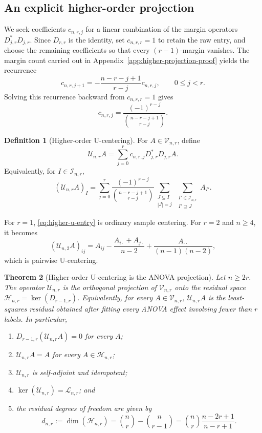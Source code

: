 \documentclass[11pt]{article}
\theoremstyle{plain}
\newtheorem{theorem}{Theorem}[section]
\theoremstyle{definition}
\newtheorem{definition}[theorem]{Definition}
\theoremstyle{remark}
\newcommand{\cI}{\mathcal I}
\newcommand{\cU}{\mathcal U}
\newcommand{\cH}{\mathcal H}
\newcommand{\cL}{\mathcal L}
\newcommand{\cV}{\mathcal V}
\begin{document}
\subsection{An explicit higher-order projection}
We seek coefficients $c_{n,r,j}$ for a linear combination of the margin
operators $D_{j,r}^\ast D_{j,r}$.  Since $D_{r,r}$ is the identity, set
$c_{n,r,r}=1$ to retain the raw entry, and choose the remaining coefficients
so that every $(r-1)$-margin vanishes.
The margin count carried out in
Appendix~\ref{app:higher-projection-proof} yields the recurrence
 \[
 c_{n,r,j+1}
 =-\frac{n-r-j+1}{r-j}c_{n,r,j},
 \qquad 0\le j<r.
\]
Solving this recurrence backward from $c_{n,r,r}=1$ gives
  \[
 c_{n,r,j}
 =\frac{(-1)^{r-j}}{\binom{n-r-j+1}{r-j}}.
\]
\begin{definition}[Higher-order U-centering]
\label{def:higher-u}
For $A\in\cV_{n,r}$, define
\begin{equation}\label{eq:higher-u-operator}
 \cU_{n,r}A
 =\sum_{j=0}^r c_{n,r,j}D_{j,r}^\ast D_{j,r}A.
\end{equation}
Equivalently, for $I\in\cI_{n,r}$,
\begin{equation}\label{eq:higher-u-entry}
 (\cU_{n,r}A)_I
 =\sum_{j=0}^r
 \frac{(-1)^{r-j}}{\binom{n-r-j+1}{r-j}}
 \sum_{\substack{J\subseteq I\\|J|=j}}
 \sum_{\substack{I'\in\cI_{n,r}\\I'\supseteq J}}A_{I'}.
\end{equation}
\end{definition}

For $r=1$, \eqref{eq:higher-u-entry} is ordinary sample centering.  For
$r=2$ and $n\ge4$, it becomes
\[
 (\cU_{n,2}A)_{ij}
 =A_{ij}-\frac{A_{i\cdot}+A_{j\cdot}}{n-2}
       +\frac{A_{\cdot\cdot}}{(n-1)(n-2)},
\]
which is pairwise U-centering.

\begin{samepage}
\begin{theorem}[Higher-order U-centering is the ANOVA projection]
\label{thm:higher-projection}
Let $n\ge2r$.  The operator $\cU_{n,r}$ is the orthogonal projection of
$\cV_{n,r}$ onto the residual space
$\cH_{n,r}=\ker(D_{r-1,r})$.  Equivalently, for every
$A\in\cV_{n,r}$, $\cU_{n,r}A$ is the least-squares residual obtained after
fitting every ANOVA effect involving fewer than $r$ labels.  In particular,
\begin{enumerate}
\item $D_{r-1,r}(\cU_{n,r}A)=0$ for every $A$;
\item $\cU_{n,r}A=A$ for every $A\in\cH_{n,r}$;
\item $\cU_{n,r}$ is self-adjoint and idempotent;
\item $\ker(\cU_{n,r})=\cL_{n,r}$; and
\item the residual degrees of freedom are given by
\begin{equation}\label{eq:general-df}
 d_{n,r}:=\dim(\cH_{n,r})
 =\binom nr-\binom n{r-1}
 =\binom nr\frac{n-2r+1}{n-r+1}.
\end{equation}
\end{enumerate}
\end{theorem}
\end{samepage}
\end{document}
